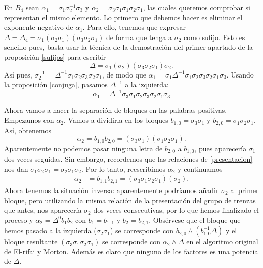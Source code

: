 \documentclass[TFG.tex]{subfiles}
\begin{document}



\begin{ej}\label{ejnormal}
En $B_4$ sean $\alpha_1=\sigma_1\sigma_2^{-1}\sigma_3$ y $\alpha_2=\sigma_3\sigma_1\sigma_1\sigma_2\sigma_1$, las cuales queremos comprobar si representan el mismo elemento. Lo primero que debemos hacer es eliminar el exponente negativo de $\alpha_1$. Para ello, tenemos que expresar $\Delta=\Delta_4=\sigma_1(\sigma_2\sigma_1)(\sigma_3\sigma_2\sigma_1)$ de forma que tenga a $\sigma_2$ como sufijo. Esto es sencillo pues, basta usar la técnica de la demostración del primer apartado de la proposición \ref{sufijos} para escribir
\[
\Delta=\sigma_1(\sigma_2)(\sigma_3\sigma_2\sigma_1)\sigma_2.
\]
Así pues, $\sigma_2^{-1}=\Delta^{-1}\sigma_1\sigma_2\sigma_3\sigma_2\sigma_1$, de modo que $\alpha_1=\sigma_1\Delta^{-1}\sigma_1\sigma_2\sigma_3\sigma_2\sigma_1\sigma_3$. Usando la proposición \ref{conjuga}, pasamos $\Delta^{-1}$ a la izquierda:
\[
\alpha_1=\Delta^{-1}\sigma_3\sigma_1\sigma_2\sigma_3\sigma_2\sigma_1\sigma_3
\]

Ahora vamos a hacer la separación de bloques en las palabras positivas. Empezamos con $\alpha_2$. Vamos a dividirla en los bloques $b_{1,0}=\sigma_3\sigma_1$ y $b_{2,0}=\sigma_1\sigma_2\sigma_1$. Así, obtenemos
\[
\alpha_2=b_{1,0}b_{2,0}=(\sigma_3\sigma_1)(\sigma_1\sigma_2\sigma_1).
\]
Aparentemente no podemos pasar ninguna letra de $b_{2,0}$ a $b_{1,0}$, pues aparecería $\sigma_1$ dos veces seguidas. Sin embargo, recordemos que las relaciones de \ref{presentacion} nos dan $\sigma_1\sigma_2\sigma_1=\sigma_2\sigma_1\sigma_2$. Por lo tanto, reescribimos $\alpha_2$ y continuamos
\begin{align*}
\alpha_2&=b_{1,1}b_{2,1}=(\sigma_3\sigma_1\sigma_2\sigma_1)(\sigma_2).
\end{align*}
Ahora tenemos la situación inversa: aparentemente podríamos añadir $\sigma_2$ al primer bloque, pero utilizando la misma relación de la presentación del grupo de trenzas que antes, nos aparecería $\sigma_2$ dos veces consecutivas, por lo que hemos finalizado el proceso y $\alpha_2=\Delta^0b_1b_2$ con $b_1=b_{1,1}$ y $b_2=b_{2,1}$. Obsérvese que el bloque que hemos pasado a la izquierda ($\sigma_2\sigma_1$) se corresponde con $b_{2,0}\land (b_{1,0}^{-1}\Delta)$ y el bloque resultante $(\sigma_3\sigma_1\sigma_2\sigma_1)$ se corresponde con $\alpha_2\land\Delta$ en el algoritmo original de El-rifai y Morton. Además es claro que ninguno de los factores es una potencia de $\Delta$.


\end{ej}
\end{document}

